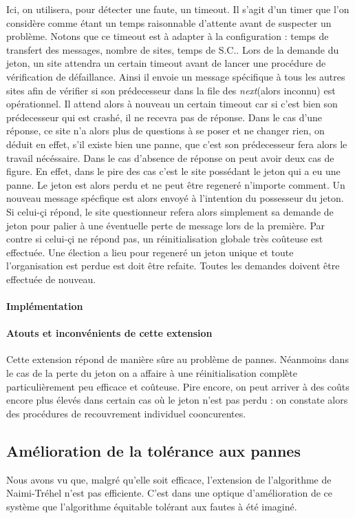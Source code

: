 \documentclass[a4paper,12pt]{article}
\newcommand{\nt}{Naimi-Tréhel }
\begin{document}
Ici, on utilisera, pour détecter une faute, un timeout. Il s'agit d'un timer que l'on considère comme étant un temps raisonnable d'attente avant de suspecter un problème. Notons que ce timeout est à adapter à la configuration : temps de transfert des messages, nombre de sites, temps de S.C..
Lors de la demande du jeton, un site attendra un certain timeout avant de lancer une procédure de vérification de défaillance. Ainsi il envoie un message spécifique à tous les autres sites afin de vérifier si son prédecesseur dans la file des \textit{next}(alors inconnu) est opérationnel. Il attend alors à nouveau un certain timeout car si c'est bien son prédecesseur qui est crashé, il ne recevra pas de réponse.
Dans le cas d'une réponse, ce site n'a alors plus de questions à se poser et ne changer rien, on déduit en effet, s'il existe bien une panne, que c'est son prédecesseur fera alors le travail nécéssaire. 
Dans le cas d'absence de réponse on peut avoir deux cas de figure. En effet, dans le pire des cas c'est le site possédant le jeton qui a eu une panne. Le jeton est alors perdu et ne peut être regeneré n'importe comment.
Un nouveau message spécfique est alors envoyé à l'intention du possesseur du jeton. Si celui-çi répond, le site questionneur refera alors simplement sa demande de jeton pour palier à une éventuelle perte de message lors de la première.
Par contre si celui-çi ne répond pas, un réinitialisation globale très coûteuse est effectuée. Une élection a lieu pour regeneré un jeton unique et toute l'organisation est perdue est doit être refaite. Toutes les demandes doivent être effectuée de nouveau.
 
\paragraph{Implémentation}
\paragraph{Atouts et inconvénients de cette extension}
Cette extension répond de manière sûre au problème de pannes. Néanmoins dans le cas de la perte du jeton on a affaire à une réinitialisation complète particulièrement peu efficace et coûteuse. Pire encore, on peut arriver à des coûts encore plus élevés dans certain cas où le jeton n'est pas perdu : on constate alors des procédures de recouvrement individuel cooncurentes.



\subsection{Amélioration de la tolérance aux pannes}
Nous avons vu que, malgré qu'elle soit efficace, l'extension de l'algorithme de \nt n'est pas efficiente. C'est dans une optique d'amélioration de ce système que l'algorithme équitable tolérant aux fautes à été imaginé.
\end{document}
